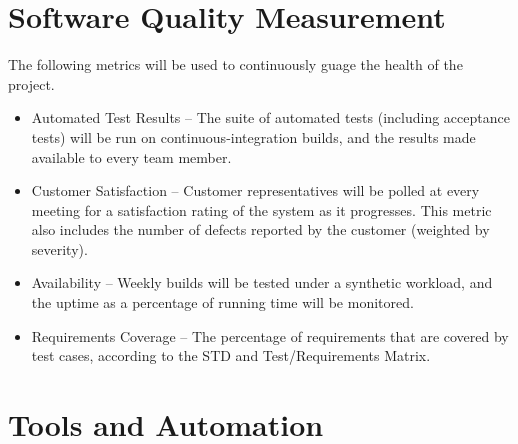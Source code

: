 \documentclass[11pt]{wacomepd}
\begin{document}
\chapter{Software Quality Measurement}
\label{metrics}

The following metrics will be used to continuously guage the health of the project.

\begin{itemize}
\item {\sc Automated Test Results} -- The suite of automated tests (including acceptance tests) will
  be run on continuous-integration builds, and the results made available to every team member.
\item {\sc Customer Satisfaction} -- Customer representatives will be polled at every meeting for a
  satisfaction rating of the system as it progresses.  This metric also includes the number of
  defects reported by the customer (weighted by severity).
\item {\sc Availability} -- Weekly builds will be tested under a synthetic workload, and the uptime
  as a percentage of running time will be monitored.
\item {\sc Requirements Coverage} -- The percentage of requirements that are covered by test cases,
  according to the STD and Test/Requirements Matrix.
\end{itemize}




\chapter{Tools and Automation}
\end{document}
